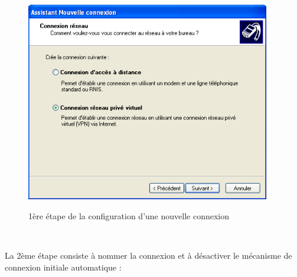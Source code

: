 \begin{figure}[H]
\begin{minipage}{0.49\textwidth}
\begin{flushright}
			\includegraphics[width=0.95\textwidth]{partie_2/screen_windows/etape2.PNG}\\
		\end{flushright}
	\end{minipage}
	\caption{1ère étape de la configuration d'une nouvelle connexion}
	\label{VPN_ETAPE1}
\end{figure}
~\

La 2ème étape consiste à nommer la connexion et à désactiver le mécanisme de connexion initiale automatique :

